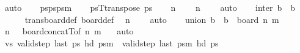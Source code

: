 \begin{isabellebody}
\ auto\isanewline
\isanewline
\ \ \isamarkupfalse%
\ {\isacharquery}{\kern0pt}ps{\isacharequal}{\kern0pt}{\isachardoublequoteopen}{\isacharquery}{\kern0pt}pspsm{}{\isachardoublequoteclose}\isanewline
\ \ \isamarkupfalse%
\ {\isacharquery}{\kern0pt}psT{\isacharequal}{\kern0pt}{\isachardoublequoteopen}transpose\ {\isacharquery}{\kern0pt}ps{\isachardoublequoteclose}\isanewline
\isanewline
\ \ \isamarkupfalse%
\ {\isachardoublequoteopen}n{\isacharminus}{\kern0pt}{}\ {\isasymge}\ {}{\isachardoublequoteclose}\ \isamarkupfalse%
\ {\isacartoucheopen}n\ {\isasymge}\ {}{}{\isacartoucheclose}\ \isamarkupfalse%
\ auto\isanewline
\ \ \isamarkupfalse%
\ inter{\isacharcolon}{\kern0pt}\ {\isachardoublequoteopen}{\isacharquery}{\kern0pt}b\ {\isasyminter}\ {\isacharquery}{\kern0pt}b\ {\isacharequal}{\kern0pt}\ {\isacharbraceleft}{\kern0pt}{\isacharbraceright}{\kern0pt}{\isachardoublequoteclose}\isanewline
\ \ \ \ \isamarkupfalse%
\ trans{\isacharunderscore}{\kern0pt}board{\isacharunderscore}{\kern0pt}def\ board{\isacharunderscore}{\kern0pt}def\ \isamarkupfalse%
\ {\isacartoucheopen}n{\isacharminus}{\kern0pt}{}\ {\isasymge}\ {}{\isacartoucheclose}\ \isamarkupfalse%
\ auto\isanewline
\ \ \isamarkupfalse%
\ union{\isacharcolon}{\kern0pt}\ {\isachardoublequoteopen}{\isacharquery}{\kern0pt}b\ {\isasymunion}\ {\isacharquery}{\kern0pt}b\ {\isacharequal}{\kern0pt}\ board\ n\ m{\isachardoublequoteclose}\isanewline
\ \ \ \ \isamarkupfalse%
\ {\isacartoucheopen}n{\isacharminus}{\kern0pt}{}\ {\isasymge}\ {}{\isacartoucheclose}\ board{\isacharunderscore}{\kern0pt}concatT{\isacharbrackleft}{\kern0pt}of\ {\isachardoublequoteopen}n{\isacharminus}{\kern0pt}{}{\isachardoublequoteclose}\ m\ {}{\isacharbrackright}{\kern0pt}\ \isamarkupfalse%
\ auto\isanewline
\isanewline
\ \ \isamarkupfalse%
\ vs{\isacharcolon}{\kern0pt}\ {\isachardoublequoteopen}valid{\isacharunderscore}{\kern0pt}step\ {\isacharparenleft}{\kern0pt}last\ {\isacharquery}{\kern0pt}ps\ {\isacharparenleft}{\kern0pt}hd\ {\isacharquery}{\kern0pt}psm{}{\isacharparenright}{\kern0pt}{\isachardoublequoteclose}\ \ {\isachardoublequoteopen}valid{\isacharunderscore}{\kern0pt}step\ {\isacharparenleft}{\kern0pt}last\ {\isacharquery}{\kern0pt}psm{}{\isacharparenright}{\kern0pt}\ {\isacharparenleft}{\kern0pt}hd\ {\isacharquery}{\kern0pt}ps\isanewline

\end{isabellebody}
